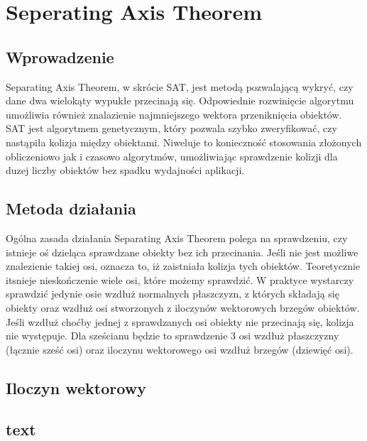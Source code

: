 \chapter{Seperating Axis Theorem}
\label{t:int}

\section{Wprowadzenie}
Separating Axis Theorem, w skrócie SAT, jest metodą pozwalającą wykryć, czy dane dwa wielokąty wypukłe przecinają się. Odpowiednie rozwinięcie algorytmu umożliwia również znalazienie najmniejszego wektora przeniknięcia obiektów.  SAT jest algorytmem genetycznym, który pozwala szybko zweryfikować, czy nastąpiła kolizja między obiektami. Niweluje to konieczność stosowania złożonych obliczeniowo jak i czasowo algorytmów, umożliwiając sprawdzenie kolizji dla duzej liczby obiektów bez spadku wydajności aplikacji.

\section{Metoda działania}
Ogólna zasada działania Separating Axis Theorem polega na sprawdzeniu, czy istnieje oś dzieląca sprawdzane obiekty bez ich przecinania. Jeśli nie jest możliwe znalezienie takiej osi, oznacza to, iż zaistniała kolizja tych obiektów. Teoretycznie itsnieje nieskończenie wiele osi, które możemy sprawdzić. W praktyce wystarczy sprawdzić jedynie osie wzdłuż normalnych płaszczyzn, z których składają się obiekty oraz wzdłuż osi stworzonych z iloczynów wektorowych brzegów obiektów. Jeśli wzdłuż choćby jednej z sprawdzanych osi obiekty nie przecinają się, kolizja nie występuje. Dla sześcianu będzie to sprawdzenie 3 osi wzdłuż płaszczyzny (łącznie sześć osi) oraz iloczynu wektorowego osi wzdłuż brzegów (dziewięć osi). \\

\section{Iloczyn wektorowy}

\section{text}